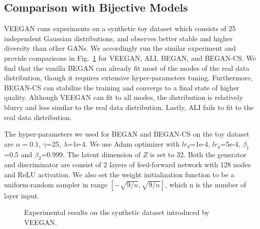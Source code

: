 \documentclass[runningheads]{llncs}
\begin{document}
    \subsection{Comparison with Bijective Models}
    \label{subsection:comparison-with-bijective}
    
    VEEGAN runs experiments on a synthetic toy dataset which consists of 25 independent Gaussian distributions, and observes better stable and higher diversity than other GANs. We accordingly run the similar experiment and provide comparisons in Fig.~\ref{Figure:VEEGAN-Toy-Result} for VEEGAN, ALI, BEGAN, and BEGAN-CS. We find that the vanilla BEGAN can already fit most of the modes of the real data distribution, though it requires extensive hyper-parameters tuning. Furthermore, BEGAN-CS can stabilize the training and converge to a final state of higher quality. Although VEEGAN can fit to all modes, the distribution is relatively blurry and less similar to the real data distribution. Lastly, ALI fails to fit to the real data distribution. 
    
    The hyper-parameters we used for BEGAN and BEGAN-CS on the toy dataset are $\alpha=0.1$, $\gamma$=25, $\lambda$=1e-4. We use Adam \cite{Adam} optimizer with ${lr}_d$=1e-4, ${lr}_g$=5e-4, $\beta_1$=0.5 and $\beta_2$=0.999. The latent dimension of $Z$ is set to 32. Both the generator and discriminator are consist of 2 layers of feed-forward network with 128 nodes and ReLU activation. We also set the weight initialization function to be a uniform-random sampler in range $[-\sqrt{9/n}, \sqrt{9/n}]$, which n is the number of layer input.
    
    \begin{figure}[!t]
        \centering
        \setlength{\tabcolsep}{4pt}
        \caption{Experimental results on the synthetic dataset introduced by VEEGAN.}
        \label{Figure:VEEGAN-Toy-Result}
        
    \end{figure}
    
\end{document}
